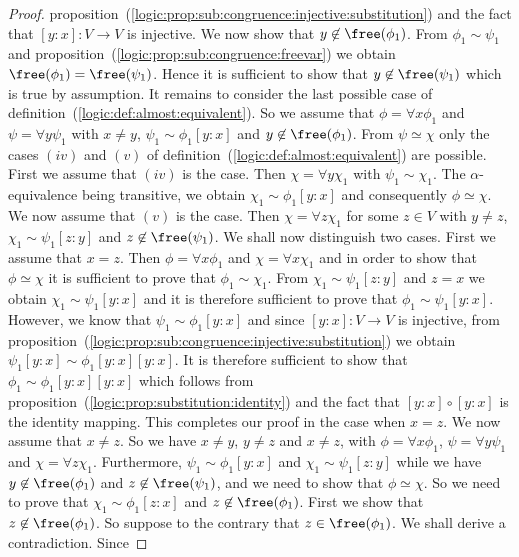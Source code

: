 \begin{proof}
proposition~(\ref{logic:prop:sub:congruence:injective:substitution})
and the fact that $[y\!:\!x]:V\to V$ is injective. We now show that
$y\not\in\free(\phi_{1})$. From $\phi_{1}\sim\psi_{1}$ and
proposition~(\ref{logic:prop:sub:congruence:freevar}) we obtain
$\free(\phi_{1})=\free(\psi_{1})$. Hence it is sufficient to show
that $y\not\in\free(\psi_{1})$ which is true by assumption. It
remains to consider the last possible case of
definition~(\ref{logic:def:almost:equivalent}). So we assume that
$\phi=\forall x\phi_{1}$ and $\psi=\forall y\psi_{1}$ with $x\neq
y$, $\psi_{1}\sim\phi_{1}[y\!:\!x]$ and $y\not\in\free(\phi_{1})$.
From $\psi\simeq\chi$ only the cases $(iv)$ and $(v)$ of
definition~(\ref{logic:def:almost:equivalent}) are possible. First
we assume that $(iv)$ is the case. Then $\chi=\forall y\chi_{1}$
with $\psi_{1}\sim\chi_{1}$. The $\alpha$-equivalence being
transitive, we obtain $\chi_{1}\sim\phi_{1}[y\!:\!x]$ and
consequently $\phi\simeq\chi$. We now assume that $(v)$ is the case.
Then $\chi=\forall z\chi_{1}$ for some $z\in V$ with $y\neq z$,
$\chi_{1}\sim\psi_{1}[z\!:\!y]$ and $z\not\in\free(\psi_{1})$. We
shall now distinguish two cases. First we assume that $x=z$. Then
$\phi=\forall x\phi_{1}$ and $\chi=\forall x\chi_{1}$ and in order
to show that $\phi\simeq\chi$ it is sufficient to prove that
$\phi_{1}\sim\chi_{1}$. From $\chi_{1}\sim\psi_{1}[z\!:\!y]$ and
$z=x$ we obtain $\chi_{1}\sim\psi_{1}[y\!:\!x]$ and it is therefore
sufficient to prove that $\phi_{1}\sim\psi_{1}[y\!:\!x]$. However,
we know that $\psi_{1}\sim\phi_{1}[y\!:\!x]$ and since
$[y\!:\!x]:V\to V$ is injective, from
proposition~(\ref{logic:prop:sub:congruence:injective:substitution})
we obtain $\psi_{1}[y\!:\!x]\sim\phi_{1}[y\!:\!x][y\!:\!x]$. It is
therefore sufficient to show that
$\phi_{1}\sim\phi_{1}[y\!:\!x][y\!:\!x]$ which follows from
proposition~(\ref{logic:prop:substitution:identity}) and the fact
that $[y\!:\!x]\circ[y\!:\!x]$ is the identity mapping. This
completes our proof in the case when $x=z$. We now assume that
$x\neq z$. So we have $x\neq y$, $y\neq z$ and $x\neq z$, with
$\phi=\forall x\phi_{1}$, $\psi=\forall y\psi_{1}$ and $\chi=\forall
z\chi_{1}$. Furthermore, $\psi_{1}\sim\phi_{1}[y\!:\!x]$ and
$\chi_{1}\sim\psi_{1}[z\!:\!y]$ while we have
$y\not\in\free(\phi_{1})$ and $z\not\in\free(\psi_{1})$, and we need
to show that $\phi\simeq\chi$. So we need to prove that
$\chi_{1}\sim\phi_{1}[z\!:\!x]$ and $z\not\in\free(\phi_{1})$. First
we show that $z\not\in\free(\phi_{1})$. So suppose to the contrary
that $z\in\free(\phi_{1})$. We shall derive a contradiction. Since

\end{proof}
